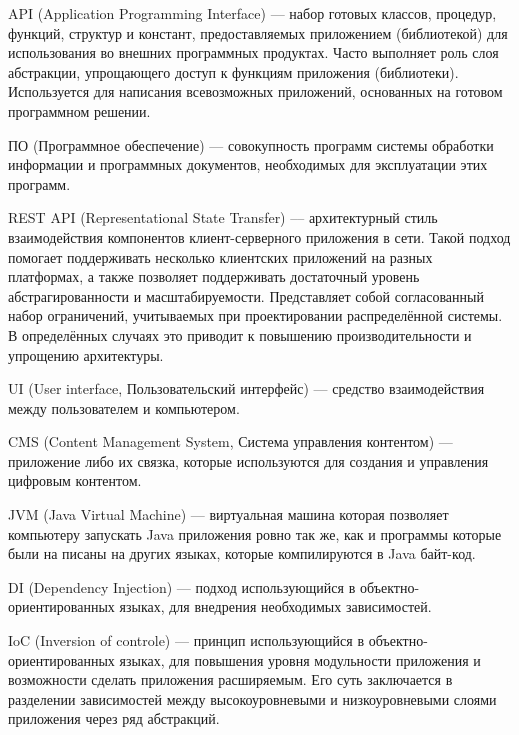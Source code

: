 \indent

\hypertarget{gloss:api}{
    API (Application Programming Interface) --- набор готовых классов, процедур, функций, структур и констант, предоставляемых приложением (библиотекой) для использования во внешних программных продуктах. 
    Часто выполняет роль слоя абстракции, упрощающего доступ к функциям приложения (библиотеки). 
    Используется для написания всевозможных приложений, основанных на готовом программном решении.
}

\hypertarget{gloss:software}{
    ПО (Программное обеспечение) --- совокупность программ системы обработки информации и программных документов, необходимых для эксплуатации этих программ.
}

\hypertarget{gloss:rest}{
    REST API (Representational State Transfer) --– архитектурный стиль взаимодействия компонентов клиент-серверного приложения в сети.
    Такой подход помогает поддерживать несколько клиентских приложений на разных платформах, а также позволяет поддерживать достаточный уровень абстрагированности и масштабируемости.
    Представляет собой согласованный набор ограничений, учитываемых при проектировании распределённой системы.
    В определённых случаях это приводит к повышению производительности и упрощению архитектуры.
}

\hypertarget{gloss:ui}{
    UI (User interface, Пользовательский интерфейс) --- средство взаимодействия между пользователем и компьютером.
}

\hypertarget{gloss:cms}{
    CMS (Content Management System, Система управления контентом) --- приложение либо их связка, которые используются для создания и управления цифровым контентом.
}

\hypertarget{gloss:jvm}{
    JVM (Java Virtual Machine) --- виртуальная машина которая позволяет компьютеру запускать Java приложения ровно так же, как и программы которые были на писаны на других языках, которые компилируются в Java байт-код.
}

\hypertarget{gloss:di}{
    DI (Dependency Injection) --- подход использующийся в объектно-ориентированных языках, для внедрения необходимых зависимостей.
}

\hypertarget{gloss:ioc}{
    IoC (Inversion of controle) --- принцип использующийся в объектно-ориентированных языках, для повышения уровня модульности приложения и возможности сделать приложения расширяемым. 
    Его суть заключается в разделении зависимостей между высокоуровневыми и низкоуровневыми слоями приложения через ряд абстракций.
}

